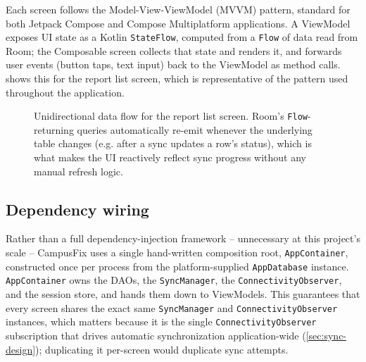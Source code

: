 Each screen follows the Model-View-ViewModel (MVVM) pattern, standard for
both Jetpack Compose and Compose Multiplatform applications. A ViewModel
exposes UI state as a Kotlin \texttt{StateFlow}, computed from a
\texttt{Flow} of data read from Room; the Composable screen collects that
state and renders it, and forwards user events (button taps, text input)
back to the ViewModel as method calls.  shows this for
the report list screen, which is representative of the pattern used
throughout the application.

\begin{figure}[htbp]
  \centering
  \caption{Unidirectional data flow for the report list screen. Room's
  \texttt{Flow}-returning queries automatically re-emit whenever the
  underlying table changes (e.g. after a sync updates a row's status),
  which is what makes the UI reactively reflect sync progress without any
  manual refresh logic.}
  \label{fig:mvvm-flow}
\end{figure}

\subsection{Dependency wiring}

Rather than a full dependency-injection framework -- unnecessary at this
project's scale -- CampusFix uses a single hand-written composition root,
\texttt{AppContainer}, constructed once per process from the
platform-supplied \texttt{AppDatabase} instance. \texttt{AppContainer}
owns the DAOs, the \texttt{SyncManager}, the \texttt{ConnectivityObserver},
and the session store, and hands them down to ViewModels. This guarantees
that every screen shares the exact same \texttt{SyncManager} and
\texttt{ConnectivityObserver} instances, which matters because it is the
single \texttt{ConnectivityObserver} subscription that drives automatic
synchronization application-wide (\cref{sec:sync-design}); duplicating it
per-screen would duplicate sync attempts.

